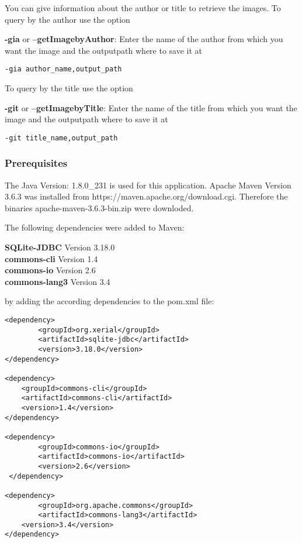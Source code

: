 You can give information about the author or title to retrieve the
images. To query by the author use the option

\textbf{-gia} or \textbf{--getImagebyAuthor}: Enter the name of the
author from which you want the image and the outputpath where to save it
at

\begin{verbatim}
-gia author_name,output_path
\end{verbatim}

To query by the title use the option

\textbf{-git} or \textbf{--getImagebyTitle}: Enter the name of the title
from which you want the image and the outputpath where to save it at

\begin{verbatim}
-git title_name,output_path
\end{verbatim}

\hypertarget{prerequisites}{%
\subsubsection{Prerequisites}\label{prerequisites}}

The Java Version: 1.8.0\_231 is used for this application. Apache Maven
Version 3.6.3 was installed from https://maven.apache.org/download.cgi.
Therefore the binaries apache-maven-3.6.3-bin.zip were downloded.

The following dependencies were added to Maven:

\textbf{SQLite-JDBC} Version 3.18.0\\
\textbf{commons-cli} Version 1.4\\
\textbf{commons-io} Version 2.6\\
\textbf{commons-lang3} Version 3.4

by adding the according dependencies to the pom.xml file:

\begin{verbatim}
<dependency>
        <groupId>org.xerial</groupId>
        <artifactId>sqlite-jdbc</artifactId>
        <version>3.18.0</version>
</dependency>

<dependency>
    <groupId>commons-cli</groupId>
    <artifactId>commons-cli</artifactId>
    <version>1.4</version>
</dependency>

<dependency>
        <groupId>commons-io</groupId>
        <artifactId>commons-io</artifactId>
        <version>2.6</version>
 </dependency>

<dependency>
        <groupId>org.apache.commons</groupId>
        <artifactId>commons-lang3</artifactId>
    <version>3.4</version>
</dependency>
\end{verbatim}

